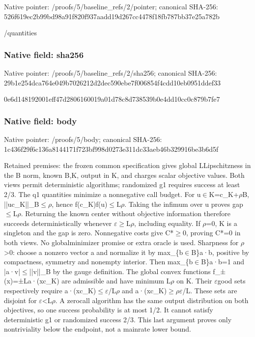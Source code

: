 \documentclass[10pt,a4paper]{article}
\begin{document}
Native pointer: /proofs/5/baseline\_refs/2/pointer; canonical SHA-256: 526f619ec2b99bd98a91f820\allowbreak{}f937aadd19d267cc4478f18f\allowbreak{}b787bb37e25a782b


/quantities


\subsubsection{Native field: sha256}


Native pointer: /proofs/5/baseline\_refs/2/sha256; canonical SHA-256: 29b1e254dca764e049b70262\allowbreak{}12d2dec590ebe7f006854f4c\allowbreak{}dd10eb0951ddef33


0e6d148192001eff47d28061\allowbreak{}60019a01d78c8d738539b0e4\allowbreak{}dd10cc0c879b7fe7


\subsubsection{Native field: body}


Native pointer: /proofs/5/body; canonical SHA-256: 1c436f29f6c136a8144171f7\allowbreak{}23bf998d0273e311dc33aeb4\allowbreak{}6b329916be3b6d5f


Retained premises: the frozen common specification gives global LLipschitzness in the B norm, known B,K, output in K, and charges scalar objective values. Both views permit deterministic algorithms; randomized g1 requires success at least 2/3. The q1 quantities minimize a nonnegative call budget. For u\ensuremath{\in}K=c\_K+\ensuremath{\rho}B, ||uc\_K||\_B\ensuremath{\le}\ensuremath{\rho}, hence f(c\_K)f(u)\ensuremath{\le}L\ensuremath{\rho}. Taking the infimum over u proves gap\ensuremath{\le}L\ensuremath{\rho}. Returning the known center without objective information therefore succeeds deterministically whenever \ensuremath{\varepsilon}\ensuremath{\ge}L\ensuremath{\rho}, including equality. If \ensuremath{\rho}=0, K is a singleton and the gap is zero. Nonnegative costs give C*\ensuremath{\ge}0, proving C*=0 in both views. No globalminimizer promise or extra oracle is used. Sharpness for \ensuremath{\rho}>0: choose a nonzero vector a and normalize it by max\_\{b\ensuremath{\in}B\}a·b, positive by compactness, symmetry and nonempty interior. Then max\_\{b\ensuremath{\in}B\}a·b=1 and |a·v|\ensuremath{\le}||v||\_B by the gauge definition. The global convex functions f\_±(x)=±La·(xc\_K) are admissible and have minimum L\ensuremath{\rho} on K. Their \ensuremath{\varepsilon}good sets respectively require a·(xc\_K)\ensuremath{\le}\ensuremath{\varepsilon}/L\ensuremath{\rho} and a·(xc\_K)\ensuremath{\ge}\ensuremath{\rho}\ensuremath{\varepsilon}/L. These sets are disjoint for \ensuremath{\varepsilon}<L\ensuremath{\rho}. A zerocall algorithm has the same output distribution on both objectives, so one success probability is at most 1/2. It cannot satisfy deterministic g1 or randomized success 2/3. This last argument proves only nontriviality below the endpoint, not a mainrate lower bound.
\end{document}
